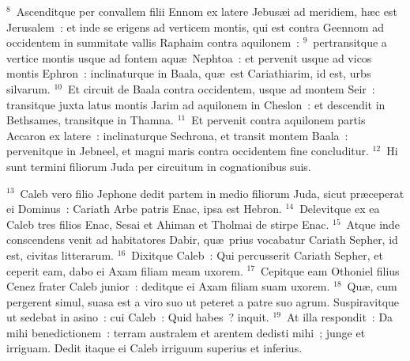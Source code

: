 ${}^{8}$~Ascenditque per convallem filii Ennom ex latere Jebus\ae i ad meridiem, h\ae c est Jerusalem~: et inde se erigens ad verticem montis, qui est contra Geennom ad occidentem in summitate vallis Raphaim contra aquilonem~:
${}^{9}$~pertransitque a vertice montis usque ad fontem aqu\ae\ Nephtoa~: et pervenit usque ad vicos montis Ephron~: inclinaturque in Baala, qu\ae\ est Cariathiarim, id est, urbs silvarum.
${}^{10}$~Et circuit de Baala contra occidentem, usque ad montem Seir~: transitque juxta latus montis Jarim ad aquilonem in Cheslon~: et descendit in Bethsames, transitque in Thamna.
${}^{11}$~Et pervenit contra aquilonem partis Accaron ex latere~: inclinaturque Sechrona, et transit montem Baala~: pervenitque in Jebneel, et magni maris contra occidentem fine concluditur.
${}^{12}$~Hi sunt termini filiorum Juda per circuitum in cognationibus suis.


${}^{13}$~Caleb vero filio Jephone dedit partem in medio filiorum Juda, sicut pr\ae ceperat ei Dominus~: Cariath Arbe patris Enac, ipsa est Hebron.
${}^{14}$~Delevitque ex ea Caleb tres filios Enac, Sesai et Ahiman et Tholmai de stirpe Enac.
${}^{15}$~Atque inde conscendens venit ad habitatores Dabir, qu\ae\ prius vocabatur Cariath Sepher, id est, civitas litterarum.
${}^{16}$~Dixitque Caleb~: Qui percusserit Cariath Sepher, et ceperit eam, dabo ei Axam filiam meam uxorem.
${}^{17}$~Cepitque eam Othoniel filius Cenez frater Caleb junior~: deditque ei Axam filiam suam uxorem.
${}^{18}$~Qu\ae , cum pergerent simul, suasa est a viro suo ut peteret a patre suo agrum. Suspiravitque ut sedebat in asino~: cui Caleb~: Quid habes~? inquit.
${}^{19}$~At illa respondit~: Da mihi benedictionem~: terram australem et arentem dedisti mihi~; junge et irriguam. Dedit itaque ei Caleb irriguum superius et inferius.


